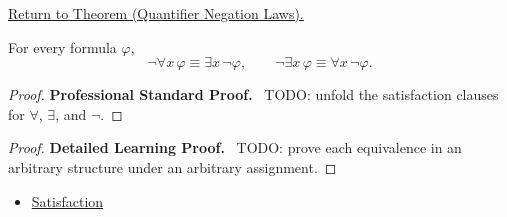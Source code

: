 \newpage
{}
\label{prf:qneg}

\begin{remark*}[Return]
\hyperref[thm:qneg]{Return to Theorem (Quantifier Negation Laws).}
\end{remark*}

\begin{theorem*}
For every formula \(\varphi\),
\[
\neg\forall x\,\varphi \equiv \exists x\,\neg\varphi,
\qquad
\neg\exists x\,\varphi \equiv \forall x\,\neg\varphi.
\]
\end{theorem*}

\begin{proof}
\textbf{Professional Standard Proof.}~
TODO: unfold the satisfaction clauses for \(\forall\), \(\exists\), and
\(\neg\).
\end{proof}

\begin{proof}
\textbf{Detailed Learning Proof.}~
TODO: prove each equivalence in an arbitrary structure under an arbitrary
assignment.
\end{proof}

\begin{remark*}
\end{remark*}

\begin{dependencies}
\begin{itemize}
  \item \hyperref[def:fol-satisfaction]{Satisfaction}
\end{itemize}
\end{dependencies}

\clearpage
